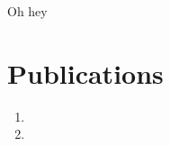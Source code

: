 
\begin{publications} 

Oh hey

  

  \section*{Publications}
  \begin{enumerate}
    \item {}
    \item {}
  \end{enumerate}
  
\end{publications}